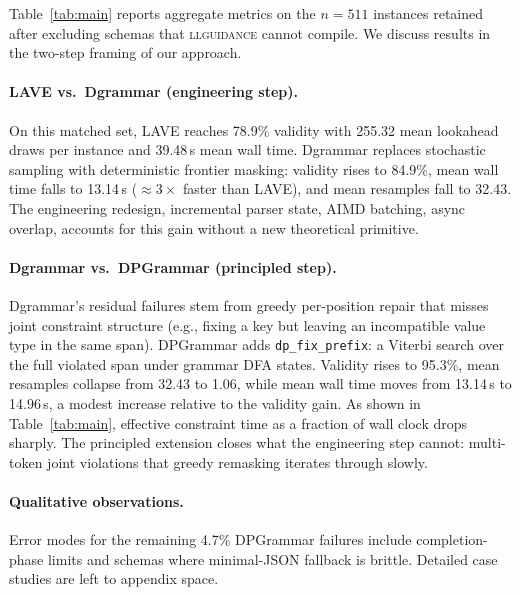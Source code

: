 Table~\ref{tab:main} reports aggregate metrics on the $n{=}511$ instances retained after excluding schemas that \textsc{llguidance} cannot compile. We discuss results in the two-step framing of our approach.

\paragraph{LAVE vs.\ Dgrammar (engineering step).}
On this matched set, LAVE reaches 78.9\% validity with 255.32 mean lookahead draws per instance and 39.48\,s mean wall time. Dgrammar replaces stochastic sampling with deterministic frontier masking: validity rises to 84.9\%, mean wall time falls to 13.14\,s ($\approx\!3\times$ faster than LAVE), and mean resamples fall to 32.43. The engineering redesign, incremental parser state, AIMD batching, async overlap, accounts for this gain without a new theoretical primitive.

\paragraph{Dgrammar vs.\ DPGrammar (principled step).}
Dgrammar's residual failures stem from greedy per-position repair that misses joint constraint structure (e.g., fixing a key but leaving an incompatible value type in the same span). DPGrammar adds \texttt{dp\_fix\_prefix}: a Viterbi search over the full violated span under grammar DFA states. Validity rises to 95.3\%, mean resamples collapse from 32.43 to 1.06, while mean wall time moves from 13.14\,s to 14.96\,s, a modest increase relative to the validity gain. As shown in Table~\ref{tab:main}, effective constraint time as a fraction of wall clock drops sharply. The principled extension closes what the engineering step cannot: multi-token joint violations that greedy remasking iterates through slowly.

\paragraph{Qualitative observations.}
Error modes for the remaining 4.7\% DPGrammar failures include completion-phase limits and schemas where minimal-JSON fallback is brittle. Detailed case studies are left to appendix space.

